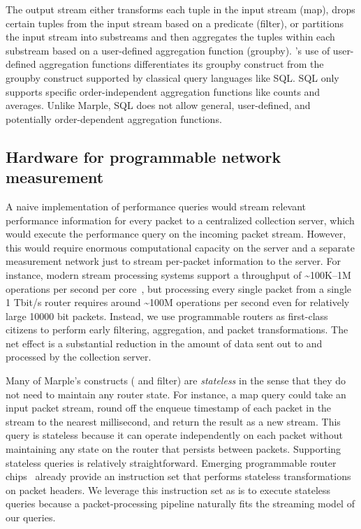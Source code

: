 The output stream either transforms each tuple in the input stream ({\ct map}),
drops certain tuples from the input stream based on a predicate ({\ct filter}),
or partitions the input stream into substreams and then
aggregates the tuples within each substream based on a user-defined aggregation
function ({\ct groupby}). \TheSystem's use of user-defined aggregation
functions differentiates its groupby construct from the groupby construct
supported by classical query languages like SQL. SQL only supports specific
order-independent aggregation functions like counts and averages. Unlike Marple, SQL does not
allow general, user-defined, and potentially order-dependent aggregation
functions. 

\subsection{Hardware for programmable network measurement}
\label{ss:intro_pq_hardware}

A naive implementation of performance queries would stream relevant performance information
for every packet to a
centralized collection server, which would execute the performance query on the
incoming packet stream. However, this would require enormous computational
capacity on the server and a separate measurement network just to stream per-packet information
 to the server. For instance, modern stream processing systems support a
throughput of \textasciitilde100K--1M operations per second per
core~\cite{kafka_benchmark, redis_benchmark, memcached_benchmark,
redis_vs_memcached_update, spark-streaming}, but processing every single packet
from a single 1 Tbit/s router requires around \textasciitilde100M operations
per second even for relatively large 10000 bit packets. Instead, we use programmable
routers as first-class citizens to perform early filtering, aggregation, and
packet transformations. The net effect is a substantial reduction in the amount
of data sent out to and processed by the collection server.

Many of Marple's constructs ( and {\ct filter}) are {\em
stateless} in the sense that they do not need to maintain any router state. For
instance, a {\ct map} query could take an input packet stream, round
off the enqueue timestamp of each packet in the stream to the nearest
millisecond, and return the result as a new stream.  This query is stateless
because it can operate independently on each packet without maintaining any
state on the router that persists between packets. Supporting stateless queries
 is relatively straightforward. Emerging
programmable router chips~\cite{rmt, xpliant, flexpipe, tofino} already provide
an instruction set that performs stateless transformations on packet headers.
We leverage this instruction set as is to execute stateless queries because a
packet-processing pipeline naturally fits the streaming model of our queries.

